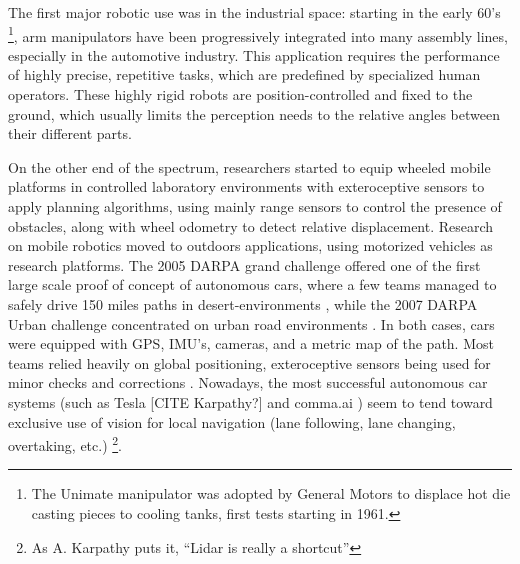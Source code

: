 The first major robotic use was in the industrial space: 
starting in the early 60's \footnote{The Unimate manipulator was adopted by General Motors to displace hot die casting pieces to cooling tanks, first tests starting in 1961.}, 
arm manipulators have been progressively integrated into many assembly lines, especially in the automotive industry. 
This application requires the performance of highly precise, repetitive tasks, which are predefined by specialized human operators.
These highly rigid robots are position-controlled and fixed to the ground, which usually limits the perception needs to the relative angles between their different parts.

On the other end of the spectrum, researchers started to equip wheeled mobile platforms in controlled laboratory environments with exteroceptive sensors 
\cite{Nilsson1984ShakeyTR, chatila1985position} to apply planning algorithms, using mainly range sensors to control the presence of obstacles, along with wheel odometry
to detect relative displacement. 
Research on mobile robotics moved to outdoors applications, using motorized vehicles as research platforms. The 2005 DARPA grand challenge
offered one of the first large scale proof of concept of autonomous cars, where a few teams managed to safely drive 150 miles paths in desert-environments 
\cite{thrun2006stanley}, while the 2007 DARPA Urban challenge concentrated on urban road environments \cite{urmson2008autonomous}. In both cases, cars were 
equipped with GPS, IMU's, cameras, and a metric map of the path. Most teams relied heavily on global positioning, exteroceptive sensors being used for 
minor checks and corrections \cite{hillel2014recent}. Nowadays, the most successful autonomous car systems (such as Tesla [CITE Karpathy?] and comma.ai \cite{comma2020openpilot}) 
seem to tend toward exclusive use of vision for local navigation (lane following, lane changing, overtaking, etc.) \footnote{As A. Karpathy puts it, “Lidar is really a shortcut”}. 


